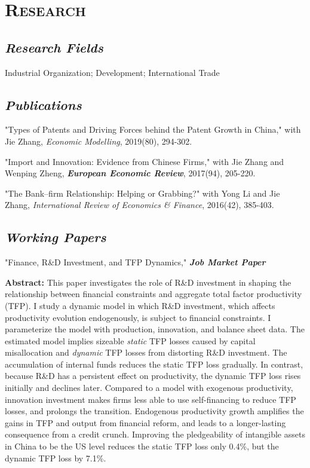 \documentclass[letterpaper]{article}
\begin{document}
\section*{\textsc{Research}}
\subsection*{\textit{Research Fields}}
 Industrial Organization; Development; International Trade

\subsection*{\textit{Publications}}
"Types of Patents and Driving Forces behind the Patent Growth in China," with Jie Zhang, \textit{Economic Modelling}, 2019(80), 294-302.
\vspace{0.5em}

"Import and Innovation: Evidence from Chinese Firms," with Jie Zhang and Wenping Zheng, {\textbf{\textit{European Economic Review}}}, 2017(94), 205-220.
\vspace{0.5em}

"The Bank–firm Relationship: Helping or Grabbing?" with Yong Li and Jie Zhang, {\textit{International Review of Economics \& Finance}}, 2016(42), 385-403.
\vspace{0.5em}

\subsection*{\textit{Working Papers}}

 "Finance, R\&D Investment, and TFP Dynamics," \textbf{\textit {Job Market Paper}}
 \vspace{0.05in}
 \begin{center}
 \begin{minipage}{0.9\linewidth}
   \textbf{Abstract:} This paper investigates the role of R\&D investment in shaping the relationship between financial constraints and aggregate total factor productivity (TFP). I study a dynamic model in which R\&D investment, which affects productivity evolution endogenously, is subject to financial constraints. I parameterize the model with production, innovation, and balance sheet data. The estimated model implies sizeable \textit{static} TFP losses caused by capital misallocation and \textit{dynamic} TFP losses from distorting R\&D investment. The accumulation of internal funds reduces the static TFP loss gradually. In contrast, because R\&D has a persistent effect on productivity, the dynamic TFP loss rises initially and declines later. Compared to a model with exogenous productivity, innovation investment makes firms less able to use self-financing to reduce TFP losses, and prolongs the transition. Endogenous productivity growth amplifies the gains in TFP and output from financial reform, and leads to a longer-lasting consequence from a credit crunch. Improving the pledgeability of intangible assets in China to be the US level reduces the static TFP loss only 0.4\%, but the dynamic TFP loss by 7.1\%.
 \end{minipage}
 \end{center}
 \vspace{0.05in}
\end{document}
